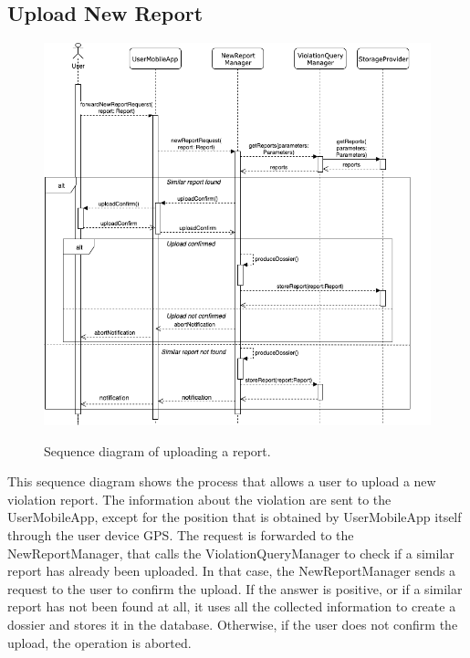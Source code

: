 \documentclass[../RASD.tex]{subfiles}
\begin{document}
    \subsection{Upload New Report}\label{subsec:upload-new-report}
    \begin{figure}[H]
        \centering
        \includegraphics[scale = 2]{assets/sequence_diagrams/uploadReport.png}\\
        \caption[\textit{Sequence} Diagram (\textit{Upload a report})]{Sequence diagram of uploading a report.}
    \end{figure}
    This sequence diagram shows the process that allows a user to upload a new violation report.
    The information about the violation are sent to the UserMobileApp, except for the position that is obtained by UserMobileApp itself
    through the user device GPS. The request is forwarded to the NewReportManager,
    that calls the ViolationQueryManager to check if a similar report has already been uploaded.
    In that case, the NewReportManager sends a request to the user to confirm the upload.
    If the answer is positive, or if a similar report has not been found at all, it uses all the collected information to create a dossier and stores it in the database.
    Otherwise, if the user does not confirm the upload, the operation is aborted.
\end{document}
